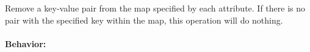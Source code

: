 Remove a key-value pair from the map specified by each attribute.  If there is
no pair with the specified key within the map, this operation will do nothing.

\paragraph{Behavior:}
\begin{itemize}[noitemsep]

\end{itemize}
